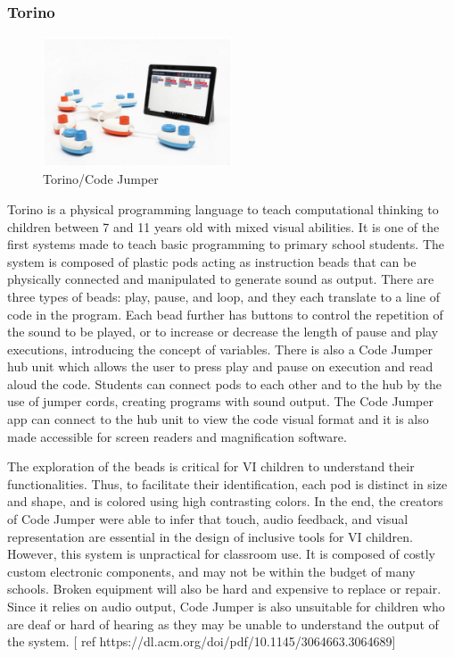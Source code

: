\documentclass[oneside,%
                    author={Malak Hajji},
                    degree={BSc},
                    title={Designing An Accessible Computational Toolkit For Students},
                  subtitle={With Mixed Visual Abilities}]{dissertation}
\begin{document}
\subsubsection{Torino}
\begin{figure}
    \centering
    \includegraphics[width=0.5\textwidth]{thesis/torino.eps}
    \caption{Torino/Code Jumper}
    \label{fig-torino}
\end{figure}
Torino is a physical programming language to teach computational thinking to children between 7 and 11 years old with mixed visual abilities. It is one of the first systems made to teach basic programming to primary school students. The system is composed of plastic pods acting as instruction beads that can be physically connected and manipulated to generate sound as output. There are three types of beads: play, pause, and loop, and they each translate to a line of code in the program. Each bead further has buttons to control the repetition of the sound to be played, or to increase or decrease the length of pause and play executions, introducing the concept of variables. There is also a Code Jumper hub unit which allows the user to press play and pause on execution and read aloud the code. Students can connect pods to each other and to the hub by the use of jumper cords, creating programs with sound output. The Code Jumper app can connect to the hub unit to view the code visual format and it is also made accessible for screen readers and magnification software.  

The exploration of the beads is  critical for VI children to understand their functionalities. Thus, to facilitate their identification, each pod is distinct in size and shape, and is colored using high contrasting colors. In the end, the creators of Code Jumper were able to infer that touch, audio feedback, and visual representation are essential in the design of inclusive tools for VI children.
However, this system is unpractical for classroom use. It is composed of costly custom electronic components, and may not be within the budget of many schools. Broken equipment will also be hard and expensive to replace or repair. Since it relies on audio output, Code Jumper is also unsuitable for children who are deaf or hard of hearing as they may be unable to understand the output of the system. [ ref https://dl.acm.org/doi/pdf/10.1145/3064663.3064689]
\end{document}
